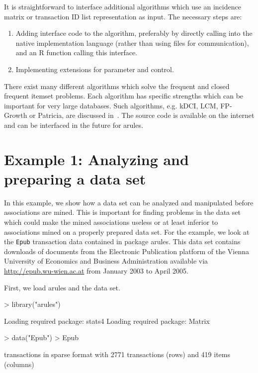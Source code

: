 \documentclass[10pt,a4paper]{article}
\newcommand{\strong}[1]{{\normalfont\fontseries{b}\selectfont #1}}
\newcommand{\class}[1]{\textsf{#1}}
\newcommand{\code}[1]{\texttt{#1}}
\newcommand{\pkg}[1]{\strong{#1}}
\newcommand{\proglang}[1]{\textsf{#1}}
\begin{document}
It is straightforward to interface additional algorithms which use an
incidence matrix or transaction ID list representation as input.  The
necessary steps are:

\begin{enumerate}
 \item Adding interface code to the algorithm, preferably by directly
  calling into the native implementation language (rather than using
  files for communication), and an \proglang{R} function calling this
  interface.
 \item Implementing extensions for \class{parameter} and
  \class{control}.
\end{enumerate}

There exist many different algorithms which solve the frequent 
and closed frequent itemset problems.
Each algorithm has specific strengths which can be important for
very large databases.
Such algorithms, e.g. kDCI, LCM, FP-Growth or Patricia, are
discussed in~\cite{arules:Goethals+Zaki:2003}.  
The source code is available on the internet and can be interfaced 
in the future for \pkg{arules}. 




\section{Example 1: Analyzing and preparing a data set \label{sec:example-screen}}

In this example, 
we show how a data set can be analyzed and manipulated
before associations are mined.
This is important for finding problems in the data set which 
could make the mined associations useless or at least inferior
to associations mined on a properly prepared data set.
For the example,
we look at the \code{Epub} transaction data contained in
package \pkg{arules}.  This data set contains downloads of documents
from the Electronic Publication platform of the Vienna University of
Economics and Business Administration available via
\url{http://epub.wu-wien.ac.at} from January 2003 to April 2005.

First, we load \pkg{arules} and the data set.

\begin{Schunk}
\begin{Sinput}
> library("arules")
\end{Sinput}
\begin{Soutput}
Loading required package: stats4
Loading required package: Matrix
\end{Soutput}
\begin{Sinput}
> data("Epub")
> Epub
\end{Sinput}
\begin{Soutput}
transactions in sparse format with
 2771 transactions (rows) and
 419 items (columns)
\end{Soutput}
\end{Schunk}
\end{document}
